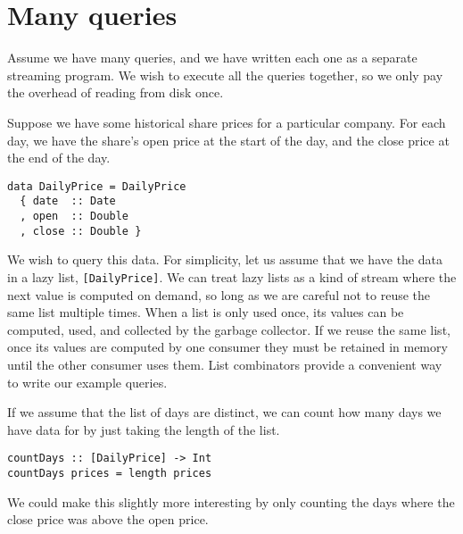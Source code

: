 
\section{Many queries}

Assume we have many queries, and we have written each one as a separate streaming program.
We wish to execute all the queries together, so we only pay the overhead of reading from disk once.

Suppose we have some historical share prices for a particular company.
For each day, we have the share's open price at the start of the day, and the close price at the end of the day.

\begin{lstlisting}
data DailyPrice = DailyPrice
  { date  :: Date
  , open  :: Double
  , close :: Double }
\end{lstlisting}

We wish to query this data.
For simplicity, let us assume that we have the data in a lazy list, \lstinline/[DailyPrice]/.
We can treat lazy lists as a kind of stream where the next value is computed on demand, so long as we are careful not to reuse the same list multiple times.
When a list is only used once, its values can be computed, used, and collected by the garbage collector.
If we reuse the same list, once its values are computed by one consumer they must be retained in memory until the other consumer uses them.
List combinators provide a convenient way to write our example queries.

If we assume that the list of days are distinct, we can count how many days we have data for by just taking the length of the list.

\begin{lstlisting}
countDays :: [DailyPrice] -> Int
countDays prices = length prices
\end{lstlisting}

We could make this slightly more interesting by only counting the days where the close price was above the open price.

